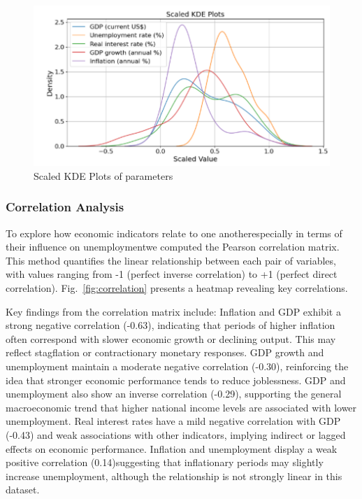 \documentclass[conference]{IEEEtran}
\begin{document}
\begin{figure}[H]
    \centering
    \includegraphics[width=0.9\linewidth]{kde_plot.png}
    \caption{Scaled KDE Plots of parameters}
    \label{fig:kde}
\end{figure}
\vspace*{-1.3em}

\subsubsection*{Correlation Analysis}
To explore how economic indicators relate to one another\textemdash especially in terms of their influence on unemployment\textemdash we computed the Pearson correlation matrix. This method quantifies the linear relationship between each pair of variables, with values ranging from -1 (perfect inverse correlation) to +1 (perfect direct correlation). Fig.~\ref{fig:correlation} presents a heatmap revealing key correlations.

Key findings from the correlation matrix include:
Inflation and GDP exhibit a strong negative correlation (-0.63), indicating that periods of higher inflation often correspond with slower economic growth or declining output. This may reflect stagflation or contractionary monetary responses.
GDP growth and unemployment maintain a moderate negative correlation (-0.30), reinforcing the idea that stronger economic performance tends to reduce joblessness.
GDP and unemployment also show an inverse correlation (-0.29), supporting the general macroeconomic trend that higher national income levels are associated with lower unemployment.
Real interest rates have a mild negative correlation with GDP (-0.43) and weak associations with other indicators, implying indirect or lagged effects on economic performance.
Inflation and unemployment display a weak positive correlation (0.14)\textemdash suggesting that inflationary periods may slightly increase unemployment, although the relationship is not strongly linear in this dataset.
\end{document}
